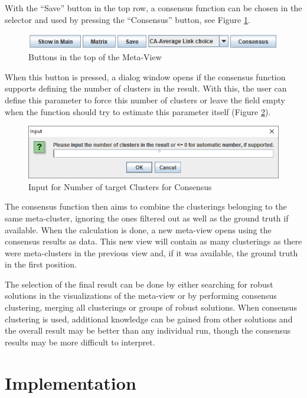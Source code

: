 \documentclass[
	a4paper,
	english,
	twoside,
	openright,               
	11pt                            
	]{report}
\begin{document}
With the ``Save'' button in the top row, a consensus function can be chosen in the selector and used by pressing the ``Consensus'' button, see Figure \ref{fig:cons_button}. 

\begin{figure}[h]
	\centering
	\includegraphics[scale=.75]{cons_button}
	\caption{Buttons in the top of the Meta-View}
	\label{fig:cons_button}
\end{figure}

When this button is pressed, a dialog window opens if the consensus function supports defining the number of clusters in the result. With this, the user can define this parameter to force this number of clusters or leave the field empty when the function should try to estimate this parameter itself (Figure \ref{fig:choosek_window}).

\begin{figure}[h]
	\centering
	\includegraphics[scale=.6]{choosek_window}
	\caption{Input for Number of target Clusters for Consensus}
	\label{fig:choosek_window}
\end{figure}

The consensus function then aims to combine the clusterings belonging to the same meta-cluster, ignoring the ones filtered out as well as the ground truth if available. When the calculation is done, a new meta-view opens using the consensus results as data. This new view will contain as many clusterings as there were meta-clusters in the previous view and, if it was available, the ground truth in the first position.

The selection of the final result can be done by either searching for robust solutions in the visualizations of the meta-view or by performing consensus clustering, merging all clusterings or groups of robust solutions. When consensus clustering is used, additional knowledge can be gained from other solutions and the overall result may be better than any individual run, though the consensus results may be more difficult to interpret.

\chapter{Implementation}\label{cha:impl}
\end{document}
